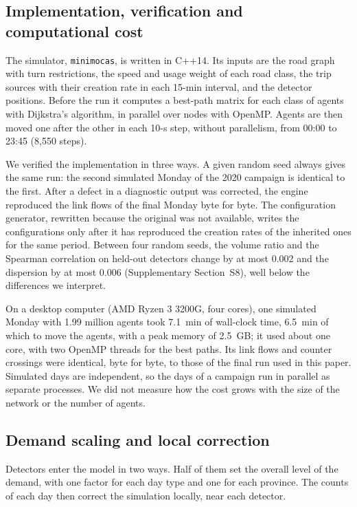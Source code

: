 \documentclass[preprint,11pt,a4paper]{elsarticle}
\begin{document}
\subsection{Implementation, verification and computational cost}
\label{sec:implementation}
The simulator, \texttt{minimocas}, is written in C++14. Its inputs are the road graph with turn restrictions, the speed and usage weight of each road class, the trip sources with their creation rate in each 15-min interval, and the detector positions. Before the run it computes a best-path matrix for each class of agents with Dijkstra's algorithm, in parallel over nodes with OpenMP. Agents are then moved one after the other in each 10-s step, without parallelism, from 00:00 to 23:45 (8,550 steps).

We verified the implementation in three ways. A given random seed always gives the same run: the second simulated Monday of the 2020 campaign is identical to the first. After a defect in a diagnostic output was corrected, the engine reproduced the link flows of the final Monday byte for byte. The configuration generator, rewritten because the original was not available, writes the configurations only after it has reproduced the creation rates of the inherited ones for the same period. Between four random seeds, the volume ratio and the Spearman correlation on held-out detectors change by at most 0.002 and the dispersion by at most 0.006 (Supplementary Section~S8), well below the differences we interpret.

On a desktop computer (AMD Ryzen 3 3200G, four cores), one simulated Monday with 1.99 million agents took 7.1~min of wall-clock time, 6.5~min of which to move the agents, with a peak memory of 2.5~GB; it used about one core, with two OpenMP threads for the best paths. Its link flows and counter crossings were identical, byte for byte, to those of the final run used in this paper. Simulated days are independent, so the days of a campaign run in parallel as separate processes. We did not measure how the cost grows with the size of the network or the number of agents.

\subsection{Demand scaling and local correction}
Detectors enter the model in two ways. Half of them set the overall level of the demand, with one factor for each day type and one for each province. The counts of each day then correct the simulation locally, near each detector.
\end{document}
